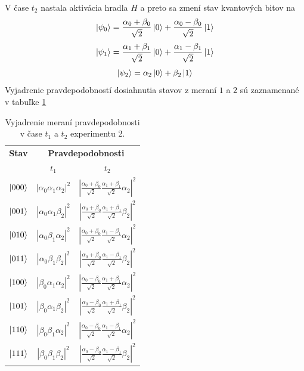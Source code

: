 V čase \(t_2\) nastala aktivácia hradla \(H\) a preto sa zmení stav kvantových
bitov na 
\[\ket{\psi_0} = \frac{\alpha_0 + \beta_0}{\sqrt{2}}\ket{0} + \frac{\alpha_0 - \beta_0}{\sqrt{2}}\ket{1}\]
\[\ket{\psi_1} = \frac{\alpha_1 + \beta_1}{\sqrt{2}}\ket{0} + \frac{\alpha_1 - \beta_1}{\sqrt{2}}\ket{1}\]
\[\ket{\psi_2} = \alpha_2\ket{0} + \beta_2\ket{1}\]
Vyjadrenie pravdepodobností dosiahnutia stavov z meraní \(1\) a \(2\) sú 
zaznamenané v tabuľke \ref{expr2_tanal12}

\begin{table}
\centering
\begin{tabular}{|c|c|c|}
\hline
\textbf{Stav} & \multicolumn{2}{c|}{\textbf{Pravdepodobnosti}} \\
 & \(t_1\) & \(t_2\) \\
\hline
\(\ket{000}\) & \(|\alpha_0\alpha_1\alpha_2|^2\) & 
\(|\frac{\alpha_0 + \beta_0}{\sqrt{2}} \frac{\alpha_1 + \beta_1}{\sqrt{2}} \alpha_2|^2\) \\

\(\ket{001}\) & \(|\alpha_0\alpha_1\beta_2|^2\) & 
\(|\frac{\alpha_0 + \beta_0}{\sqrt{2}} \frac{\alpha_1 + \beta_1}{\sqrt{2}} \beta_2|^2\)  \\

\(\ket{010}\) & \(|\alpha_0\beta_1\alpha_2|^2\) & 
\(|\frac{\alpha_0 + \beta_0}{\sqrt{2}} \frac{\alpha_1 - \beta_1}{\sqrt{2}} \alpha_2|^2\)   \\

\(\ket{011}\) & \(|\alpha_0\beta_1\beta_2|^2\) &
\(|\frac{\alpha_0 + \beta_0}{\sqrt{2}} \frac{\alpha_1 - \beta_1}{\sqrt{2}} \beta_2|^2\)  \\

\(\ket{100}\) & \(|\beta_0\alpha_1\alpha_2|^2\) &
\(|\frac{\alpha_0 - \beta_0}{\sqrt{2}} \frac{\alpha_1 + \beta_1}{\sqrt{2}} \alpha_2|^2\)   \\

\(\ket{101}\) & \(|\beta_0\alpha_1\beta_2|^2\) &
\(|\frac{\alpha_0 - \beta_0}{\sqrt{2}} \frac{\alpha_1 + \beta_1}{\sqrt{2}} \beta_2|^2\)   \\

\(\ket{110}\) & \(|\beta_0\beta_1\alpha_2|^2\) & 
 \(|\frac{\alpha_0 - \beta_0}{\sqrt{2}} \frac{\alpha_1 - \beta_1}{\sqrt{2}} \alpha_2|^2\)  \\

\(\ket{111}\) & \(|\beta_0\beta_1\beta_2|^2\) & 
\(|\frac{\alpha_0 - \beta_0}{\sqrt{2}} \frac{\alpha_1 - \beta_1}{\sqrt{2}} \beta_2|^2\)   \\
\hline

\end{tabular}

\caption{\label{expr2_tanal12} Vyjadrenie meraní pravdepodobnosti v čase 
\(t_1\) a \(t_2\) experimentu 2.}
\end{table}


